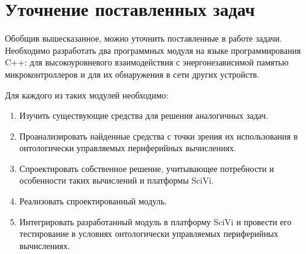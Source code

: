 \section{Уточнение поставленных задач}

Обобщив вышесказанное, можно уточнить поставленные в работе задачи.
Необходимо разработать два программных модуля на языке программирования C++: для высокоуровневого взаимодействия с энергонезависимой памятью микроконтроллеров и для их обнаружения в сети других устройств.

Для каждого из таких модулей необходимо:
\begin{enumerate}
	\item Изучить существующие средства для решения аналогичных задач.
	\item Проанализировать найденные средства с точки зрения их использования в онтологически управляемых периферийных вычислениях.
	\item Спроектировать собственное решение, учитывающее потребности и особенности таких вычислений и платформы SciVi.
	\item Реализовать спроектированный модуль.
	\item Интегрировать разработанный модуль в платформу SciVi и провести его тестирование в условиях онтологически управляемых периферийных вычислениях.
\end{enumerate}
